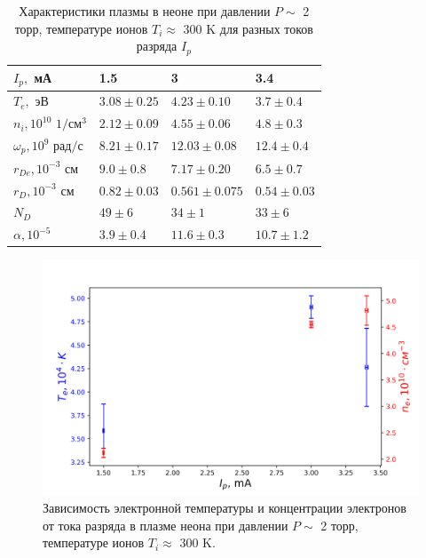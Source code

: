 \documentclass[a4paper,12pt]{article} %
\begin{document}
\begin{table}[h!]
\caption{Характеристики плазмы в неоне при давлении $P \sim$ 2 торр, температуре ионов $T_i \approx $ 300 K для разных токов разряда $I_p$}
\label{data}
\begin{tabular}{|l|l|l|l|}
\hline
$I_p,$ мА                & 1.5               & 3                 & 3.4               \\ \hline
$T_e,$ эВ                & $ 3.08 \pm 0.25 $   & $ 4.23 \pm 0.10 $   & $ 3.7 \pm 0.4 $   \\ \hline
$n_i, 10^{10}$ $ 1/см^3$    & $ 2.12 \pm 0.09 $   & $ 4.55 \pm 0.06 $   & $ 4.8 \pm 0.3 $   \\ \hline
$\omega_p, 10^{9}$ $ рад/с$ & $ 8.21 \pm 0.17 $   & $ 12.03 \pm 0.08 $  & $ 12.4 \pm 0.4 $  \\ \hline
$r_{De}, 10^{-3} $ $см$     & $ 9.0 \pm 0.8 $   & $ 7.17 \pm 0.20 $   & $ 6.5 \pm 0.7 $   \\ \hline
$r_{D}, 10^{-3} $ $см$      & $ 0.82 \pm 0.03 $ & $ 0.561 \pm 0.075 $ & $ 0.54 \pm 0.03 $ \\ \hline
$N_{D}$                  & $ 49 \pm 6 $      & $ 34 \pm 1 $      & $ 33 \pm 6 $      \\ \hline
$\alpha, 10^{-5}$        & $ 3.9 \pm 0.4 $   & $ 11.6 \pm 0.3 $  & $ 10.7 \pm 1.2 $  \\ \hline
\end{tabular}
\end{table}


\begin{figure}[h!]
\begin{center}
\includegraphics[width=\textwidth]{T,n(I_p)}
\caption{Зависимость электронной температуры и концентрации электронов от тока разряда в плазме неона при давлении $P \sim$ 2 торр, температуре ионов $T_i \approx $ 300 K.} \label{от_тока_разряда}
\end{center}
\end{figure}
\end{document}
